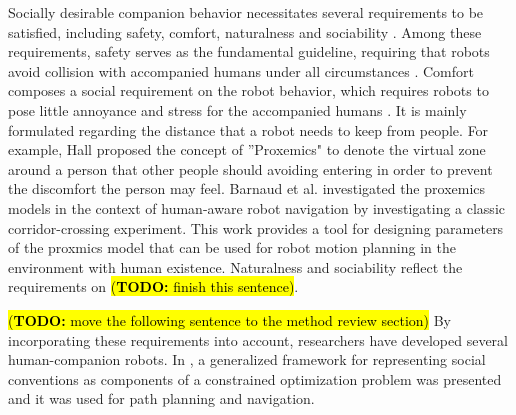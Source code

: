 \documentclass[letterpaper, 10 pt, conference]{ieeeconf}
\newcommand{\todohere}[1]{\hl{(\textbf{TODO:} #1)}}
\begin{document}
	Socially desirable companion behavior necessitates several requirements to be satisfied, including safety, comfort, naturalness and sociability \cite{kruse2013human}.
	Among these requirements, safety serves as the fundamental guideline, requiring that robots avoid collision with accompanied humans under all circumstances \cite{hoeller2007accompanying,fox1997dynamic,svenstrup2010trajectory}.
	Comfort composes a social requirement on the robot behavior, which requires robots to pose little annoyance and stress for the accompanied humans \cite{kruse2013human}.
	It is mainly formulated regarding the distance that a robot needs to keep from people.
	For example, Hall \cite{hall1968proxemics} proposed the concept of ''Proxemics" to denote the virtual zone around a person that other people should avoiding entering in order to prevent the discomfort the person may feel.
	Barnaud et al.\cite{barnaud2014proxemics} investigated the proxemics models in the context of human-aware robot navigation by investigating a classic corridor-crossing experiment.
	This work provides a tool for designing parameters of the proxmics model that can be used for robot motion planning in the environment with human existence.
	Naturalness and sociability reflect the requirements on \todohere{finish this sentence}.
	
	\todohere{move the following sentence to the method review section}
	By incorporating these requirements into account, researchers have developed several human-companion robots. 
	In \cite{kirby Companion: A constraintoptimizing method for person acceptable navigation}, a generalized framework for representing social conventions as components of a constrained optimization problem was presented and it was used for path planning and navigation.
	
\end{document}
